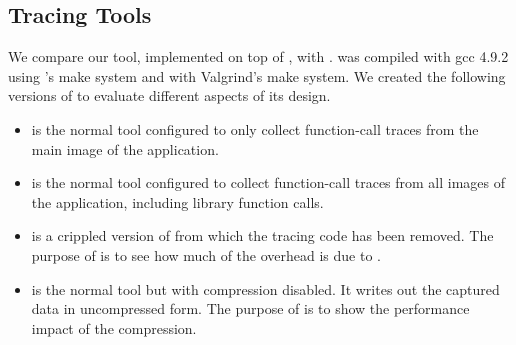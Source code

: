 \subsection{Tracing Tools}
\label{sec:tracing-tools}

We compare our \parlot tool, implemented on top of , with .
%
\parlot was compiled with gcc 4.9.2 using \pin 's make system and \callgrind with Valgrind's make system.
%
We created the following versions of \parlot to evaluate different aspects of its design.




\begin{itemize}
\item \textbf{\parlotm} is the normal \parlot tool configured to only collect function-call traces from the main image of the application.
\item \textbf{\parlota} is the normal \parlot tool configured to collect function-call traces from all images of the application, including library function calls.
\item \textbf{\pininit} is a crippled version of \parlot from which the tracing code has been removed.
%
The purpose of \pininit is to see how much of the overhead is due to \pin.
\item \textbf{\parlotnc} is the normal \parlot tool but with compression disabled.
%
It writes out the captured data in uncompressed form.
%
The purpose of \parlotnc is to show the performance impact of the compression.
\end{itemize}

